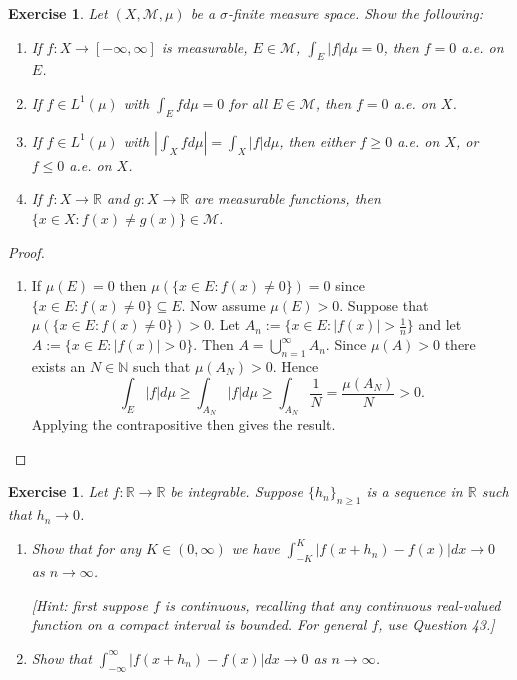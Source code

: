 \documentclass{article}
\newtheorem{exercise}[theorem]{Exercise}
\begin{document}
\begin{exercise}
Let \( (X, \mathcal{M}, \mu) \) be a \(\sigma\)-finite measure space. Show the following:
    
    \begin{enumerate}
        \item[(a)] If \( f : X \to [-\infty, \infty] \) is measurable, \( E \in \mathcal{M} \), \( \int_E |f| d\mu = 0 \), then \( f = 0 \) a.e. on \( E \).
        \item[(b)] If \( f \in L^1(\mu) \) with \( \int_E f d\mu = 0 \) for all \( E \in \mathcal{M} \), then \( f = 0 \) a.e. on \( X \).
        \item[(c)] If \( f \in L^1(\mu) \) with \( |\int_X f d\mu| = \int_X |f| d\mu \), then either \( f \geq 0 \) a.e. on \( X \), or \( f \leq 0 \) a.e. on \( X \).
        \item[(d)] If \( f : X \to \mathbb{R} \) and \( g : X \to \mathbb{R} \) are measurable functions, then \( \{ x \in X : f(x) \neq g(x) \} \in \mathcal{M} \).
    \end{enumerate}
\end{exercise}
\begin{proof}
\begin{enumerate}
    \item[(a)] If $\mu(E)=0$ then $\mu(\{x\in E:f(x)\neq 0\})=0$ since $\{x\in E:f(x)\neq 0\}\subseteq E$. Now assume $\mu(E)>0$. Suppose that $\mu(\{x\in E:f(x)\neq0\})> 0$. Let $A_n:=\{x\in E:|f(x)|>\frac{1}{n}\}$ and let $A:=\{x\in E:|f(x)|>0\}$. Then $A=\bigcup_{n=1}^\infty A_n$. Since $\mu(A)>0$ there exists an $N\in\mathbb{N}$ such that $\mu(A_N)>0$. Hence \[\int_E|f|d\mu\geq\int_{A_N}|f|d\mu\geq\int_{A_N}\frac{1}{N}=\frac{\mu(A_N)}{N}>0.\] Applying the contrapositive then gives the result.
\end{enumerate}
\end{proof}
\begin{exercise}
Let \( f : \mathbb{R} \to \mathbb{R} \) be integrable. Suppose \( \{h_n\}_{n \geq 1} \) is a sequence in \( \mathbb{R} \) such that \( h_n \to 0 \).
    
    \begin{enumerate}
        \item[(a)] Show that for any \( K \in (0, \infty) \) we have \( \int_{-K}^{K} |f(x + h_n) - f(x)|dx \to 0 \) as \( n \to \infty \). 
        
        \textit{[Hint: first suppose \( f \) is continuous, recalling that any continuous real-valued function on a compact interval is bounded. For general \( f \), use Question 43.]}
        
        \item[(b)] Show that \( \int_{-\infty}^{\infty} |f(x + h_n) - f(x)|dx \to 0 \) as \( n \to \infty \).
    \end{enumerate}
\end{exercise}  
\end{document}
